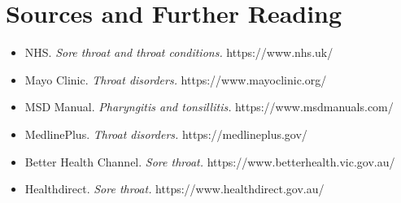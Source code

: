\section*{Sources and Further Reading}
\begin{itemize}
    \item NHS. \textit{Sore throat and throat conditions.} https://www.nhs.uk/
    \item Mayo Clinic. \textit{Throat disorders.} https://www.mayoclinic.org/
    \item MSD Manual. \textit{Pharyngitis and tonsillitis.} https://www.msdmanuals.com/
    \item MedlinePlus. \textit{Throat disorders.} https://medlineplus.gov/
    \item Better Health Channel. \textit{Sore throat.} https://www.betterhealth.vic.gov.au/
    \item Healthdirect. \textit{Sore throat.} https://www.healthdirect.gov.au/
\end{itemize}
